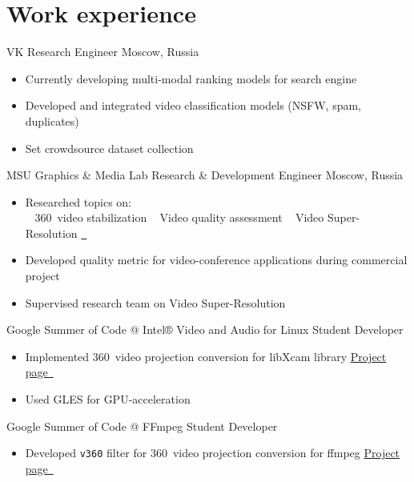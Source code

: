 \documentclass{tccv}
\newcommand{\sphere}{360\textdegree~}
\begin{document}
\section{Work experience}

\begin{eventlist}

     {VK}
     {Research Engineer}
     {Moscow, Russia}
\begin{itemize}
     \item Currently developing multi-modal ranking models for search engine
     \item Developed and integrated video classification models (NSFW, spam, duplicates)
     \item Set crowdsource dataset collection
\end{itemize}

     {MSU Graphics \& Media Lab}
     {Research \& Development Engineer}
     {Moscow, Russia}
\begin{itemize}
     \item Researched topics on:\\
          \faAngleRight~ \sphere video stabilization\qquad
          \faAngleRight~ Video quality assessment\qquad
          \faAngleRight~ Video Super-Resolution \href{https://videoprocessing.ai/benchmarks/video-super-resolution.html}{~\faExternalLink*}
     \item Developed quality metric for video-conference applications during commercial project
     \item Supervised research team on Video Super-Resolution
\end{itemize}

     {Google Summer of Code @ Intel® Video and Audio for Linux}
     {Student Developer}
     {}
\begin{itemize}
     \item Implemented \sphere video projection conversion for libXcam library\hfill
     \href{https://unishift.github.io/project/2021-08-20-gsoc-libxcam}{Project page~\faExternalLink*}
     \item Used GLES for GPU-acceleration
\end{itemize}

     {Google Summer of Code @ FFmpeg}
     {Student Developer}
     {}
\begin{itemize}
     \item Developed \texttt{v360} filter for \sphere video projection conversion for ffmpeg\hfill
     \href{https://unishift.github.io/project/2019-08-26-gsoc-ffmpeg}{Project page~\faExternalLink*}
\end{itemize}

\end{eventlist}
\end{document}
